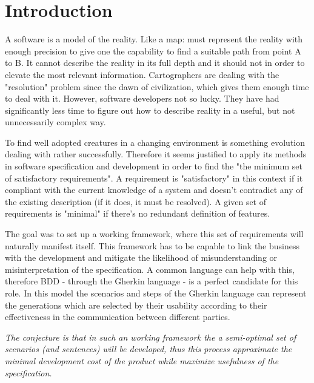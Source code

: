\documentclass[conference]{IEEEtran}
\begin{document}
%
\IEEEpeerreviewmaketitle



\section{Introduction}
A software is a model of the reality. Like a map: must represent the reality with enough precision to give one the capability to find a suitable path from point A to B. It cannot describe the reality in its full depth and it should not in order to elevate the most relevant information. Cartographers are dealing with the "resolution" problem since the dawn of civilization, which gives them enough time to deal with it. However, software developers not so lucky. They have had significantly less time to figure out how to describe reality in a useful, but not unnecessarily complex way.

To find well adopted creatures in a changing environment is something evolution dealing with rather successfully. Therefore it seems justified to apply its methods in software specification and development in order to find the "the minimum set of satisfactory requirements". A requirement is "satisfactory" in this context if it compliant with the current knowledge of a system and doesn't contradict any of the existing description (if it does, it must be resolved). A given set of requirements is "minimal" if there's no redundant definition of features.

The goal was to set up a working framework, where this set of requirements will naturally manifest itself. This framework has to be capable to link the business with the development and mitigate the likelihood of misunderstanding or misinterpretation of the specification. A common language can help with this, therefore BDD - through the Gherkin language - is a perfect candidate for this role. In this model the scenarios and steps of the Gherkin language can represent the generations which are selected by their usability according to their effectiveness in the communication between different parties.

\textit{The conjecture is that in such an working framework the a semi-optimal set of scenarios (and sentences) will be developed, thus this process approximate the minimal development cost of the product while maximize usefulness of the specification.}
\end{document}
